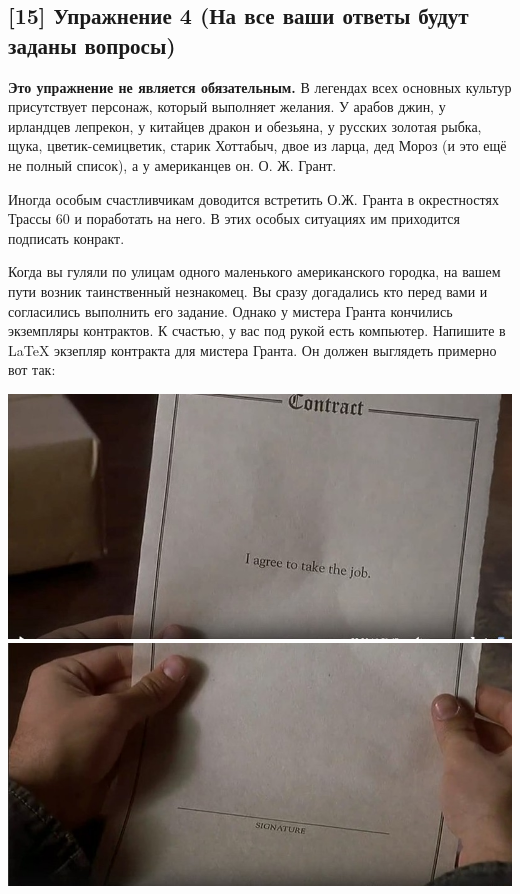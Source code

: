 \documentclass[12pt, a4paper, oneside]{article}
\begin{document}
\subsection*{[15]  Упражнение 4 (На все ваши ответы будут заданы вопросы)}

\textbf{Это упражнение не является обязательным.}  В легендах всех основных культур присутствует персонаж, который выполняет желания. У арабов джин, у ирландцев лепрекон, у китайцев дракон и обезьяна, у русских золотая рыбка, щука, цветик-семицветик, старик Хоттабыч, двое из ларца, дед Мороз (и это ещё не полный список), а у американцев он. О. Ж. Грант.

Иногда особым счастливчикам доводится встретить О.Ж. Гранта в окрестностях Трассы 60 и поработать на него. В этих особых ситуациях им приходится подписать конракт.

Когда вы гуляли по улицам одного маленького американского городка, на вашем пути возник таинственный незнакомец. Вы сразу догадались кто перед вами и согласились выполнить его задание. Однако у мистера Гранта кончились экземпляры контрактов. К счастью, у вас под рукой есть компьютер. Напишите в \LaTeX{} экзепляр контракта для мистера Гранта. Он должен выглядеть примерно вот так:

\begin{center}
	\includegraphics[scale=0.4]{Hg91uSv1cik.jpg}
	\includegraphics[scale=0.4]{t_XxgIqEmBE.jpg}
\end{center} 
\end{document}

